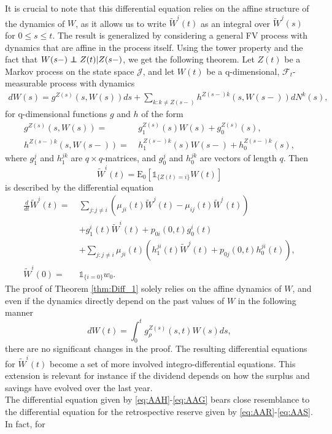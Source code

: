 \documentclass[12pt]{article}
\newcommand{\E}{\text{E}}
\newcommand{\indic}[1]{\mathds{1}_{ \{ #1 \} }}
\newcommand{\noin}{\noindent}
\newcommand\independent{\protect\mathpalette{\protect\independenT}{\perp}}
\def\independenT#1#2{\mathrel{\rlap{$#1#2$}\mkern2mu{#1#2}}}
\theoremstyle{my_thm}
\newenvironment{thm}
  {\pushQED{\qed}\renewcommand{\qedsymbol}{$\Circle$}\thmx}
  {\popQED\endthmx}
\theoremstyle{my_rem}
\begin{document}
It is crucial to note that this differential equation relies on the affine structure of the dynamics of $W$, as it allows us to write $\tilde{W}^i(t)$ as an integral over $\tilde{W}^j(s)$ for $0\leq s \leq t$. The result is generalized by considering a general FV process with dynamics that are affine in the process itself. Using the tower property and the fact that $W(s-)\independent Z(t)|Z(s-)$, we get the following theorem.
\begin{thm}[]
\label{thm:Diff_1}
Let $Z(t)$ be a Markov process on the state space $\mathcal{J}$, and let $W(t)$ be a q-dimensional, $\mathcal{F}_t$-measurable process with dynamics
\begin{align*}
dW(s)=  g^{Z(s)}(s,W(s))ds+
 \sum_{k:k \neq Z(s-)} h^{Z(s-)k}(s,W(s-)) dN^k(s),
\end{align*}
for q-dimensional functions $g$ and $h$ of the form
\begin{align*}
g^{Z(s)}(s,W(s))= \ &g^{Z(s)}_1(s) W(s)+g_0^{Z(s)}(s),
\\
h^{Z(s-)k}(s,W(s-))= \ &h_1^{Z(s-)k}(s) W(s-)+h_0^{Z(s-)k}(s),
\end{align*}
where $g_1^j$ and $h^{jk}_1$ are $q\times q$-matrices, and $g^j_0$ and $h^{jk}_0$ are vectors of length $q$. Then
$$\tilde{W}^i(t)=\E_0[\indic{Z(t)=i}W(t)]$$
is described by the differential equation
\begin{align}
\frac{d}{dt}\tilde{W}^i(t)= \ &
\sum_{j:j \neq i} \left( \mu_{ji}(t) \tilde{W}^j(t)-\mu_{ij}(t)\tilde{W}^i(t) \right)
 \label{eq:AAH} \\
&+
 g_1^i(t)\tilde{W}^i(t)+p_{0i}(0,t)g_0^i(t)
 \label{eq:AAI}\\
&+
\sum_{j:j\neq i} \mu_{ji}(t) \left(  h_1^{ji}(t) \tilde{W}^j(t) + p_{0j}(0,t)h_0^{ji}(t)\right) ,\label{eq:AAF}
\\
\tilde{W}^i(0)= \ &\indic{i=0}w_0 .\label{eq:AAG}
\end{align}
\end{thm}
\noin The proof of Theorem \ref{thm:Diff_1} solely relies on the affine dynamics of $W$, and even if the dynamics directly depend on the past values of $W$ in the following manner
$$
dW(t)=\int_0^t g_\rho^{Z(s)}(s,t)W(s) ds,
$$
there are no significant changes in the proof. The resulting differential equations for $\tilde{W}^i(t)$ become a set of more involved integro-differential equations. This extension is relevant for instance if the dividend depends on how the surplus and savings have evolved over the last year.
\\[12pt]
The differential equation given by \eqref{eq:AAH}-\eqref{eq:AAG} bears close resemblance to the differential equation for the retrospective reserve given by \eqref{eq:AAR}-\eqref{eq:AAS}. In fact, for
\end{document}
